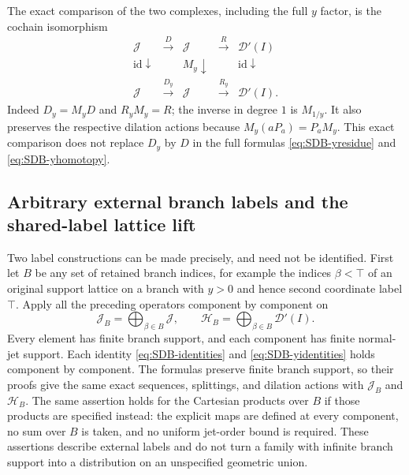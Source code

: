 The exact comparison of the two complexes, including the full $y$
factor, is the cochain isomorphism
\begin{equation}\tag{SDB31}\label{eq:SDB-complexcomparison}
 \begin{array}{ccccc}
 \mathcal J&\xrightarrow{D}&\mathcal J&\xrightarrow{R}&\mathcal D'(I)\\
 {\scriptstyle\mathrm{id}}\downarrow&&
 {\scriptstyle M_y}\downarrow&&
 {\scriptstyle\mathrm{id}}\downarrow\\
 \mathcal J&\xrightarrow{D_y}&\mathcal J&\xrightarrow{R_y}&\mathcal D'(I).
 \end{array}
\end{equation}
Indeed $D_y=M_yD$ and $R_yM_y=R$; the inverse in degree $1$ is
$M_{1/y}$. It also preserves the respective dilation actions because
$M_y(aP_a)=P_aM_y$. This exact comparison does not replace $D_y$
by $D$ in the full formulas \eqref{eq:SDB-yresidue} and
\eqref{eq:SDB-yhomotopy}.

\subsection{Arbitrary external branch labels and the shared-label lattice lift}

Two label constructions can be made precisely, and need not be
identified. First let $B$ be any set of retained branch indices, for
example the indices $\beta<\top$ of an original support lattice on
a branch with $y>0$ and hence second coordinate label $\top$.
Apply all the preceding operators component by component on
\begin{equation}\tag{SDB32}\label{eq:SDB-branchsums}
 \mathcal J_B=\bigoplus_{\beta\in B}\mathcal J,\qquad
 \mathcal H_B=\bigoplus_{\beta\in B}\mathcal D'(I).
\end{equation}
Every element has finite branch support, and each component has finite
normal-jet support. Each identity \eqref{eq:SDB-identities} and
\eqref{eq:SDB-yidentities} holds component by component. The formulas
preserve finite branch support, so their proofs give the same exact
sequences, splittings, and dilation actions with $\mathcal J_B$ and
$\mathcal H_B$. The same assertion holds for the Cartesian products
over $B$ if those products are specified instead: the explicit maps
are defined at every component, no sum over $B$ is taken, and no
uniform jet-order bound is required. These assertions describe
external labels and do not turn a family with infinite branch support
into a distribution on an unspecified geometric union.


